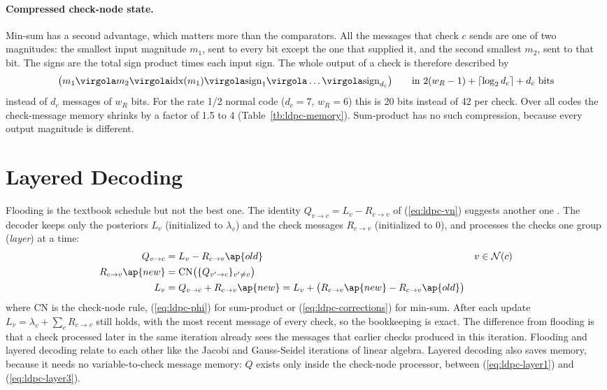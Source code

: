 \paragraph{Compressed check-node state.} Min-sum has a second advantage, which matters more than the comparators. All the messages that check \(c\) sends are one of two magnitudes: the smallest input magnitude \(m_1\), sent to every bit except the one that supplied it, and the second smallest \(m_2\), sent to that bit. The signs are the total sign product times each input sign. The whole output of a check is therefore described by
\begin{equation} \label{eq:ldpc-compressed}
\big(m_1 \virgola m_2 \virgola \mathrm{idx}(m_1) \virgola \mathrm{sign}_1 \virgola \ldots \virgola \mathrm{sign}_{d_c}\big) \qquad \text{in } 2(w_R - 1) + \lceil \log_2 d_c \rceil + d_c \text{ bits}
\end{equation}
instead of \(d_c\) messages of \(w_R\) bits. For the rate 1/2 normal code (\(d_c = 7\), \(w_R = 6\)) this is 20 bits instead of 42 per check. Over all codes the check-message memory shrinks by a factor of 1.5 to 4 (Table~\ref{tb:ldpc-memory}). Sum-product has no such compression, because every output magnitude is different.

\section{Layered Decoding} \label{sec:ldpc-layered}

Flooding is the textbook schedule but not the best one. The identity \(Q_{v \to c} = L_v - R_{c \to v}\) of (\ref{eq:ldpc-vn}) suggests another one \cite{b:MansourShanbhag, b:Hocevar}. The decoder keeps only the posteriors \(L_v\) (initialized to \(\lambda_v\)) and the check messages \(R_{c \to v}\) (initialized to 0), and processes the checks one group (\emph{layer}) at a time:
\begin{align}
Q_{v \to c} &= L_v - R_{c \to v}\ap{old} && v \in \mathcal{N}(c) \label{eq:ldpc-layer1}\\
R_{c \to v}\ap{new} &= \mathrm{CN}\big(\{Q_{v' \to c}\}_{v' \ne v}\big) && \label{eq:ldpc-layer2}\\
L_v &= Q_{v \to c} + R_{c \to v}\ap{new} = L_v + \big(R_{c \to v}\ap{new} - R_{c \to v}\ap{old}\big) \label{eq:ldpc-layer3}
\end{align}
where CN is the check-node rule, (\ref{eq:ldpc-phi}) for sum-product or (\ref{eq:ldpc-corrections}) for min-sum. After each update \(L_v = \lambda_v + \sum_c R_{c \to v}\) still holds, with the most recent message of every check, so the bookkeeping is exact. The difference from flooding is that a check processed later in the same iteration already sees the messages that earlier checks produced in this iteration. Flooding and layered decoding relate to each other like the Jacobi and Gauss-Seidel iterations of linear algebra. Layered decoding also saves memory, because it needs no variable-to-check message memory: \(Q\) exists only inside the check-node processor, between (\ref{eq:ldpc-layer1}) and (\ref{eq:ldpc-layer3}).

